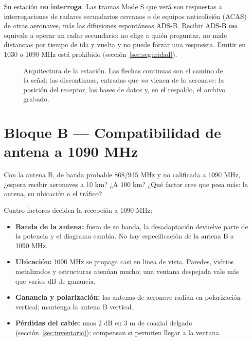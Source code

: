 \begin{alerta}
Su estación \textbf{no interroga}. Las tramas Mode S que verá son respuestas a interrogaciones de radares secundarios cercanos o de equipos anticolisión (ACAS) de otras aeronaves, más las difusiones espontáneas ADS-B. Recibir ADS-B \textbf{no} equivale a operar un radar secundario: no elige a quién preguntar, no mide distancias por tiempo de ida y vuelta y no puede forzar una respuesta. Emitir en 1030 o 1090 MHz está prohibido (sección~\ref{sec:seguridad}).
\end{alerta}

\begin{figure}[H]
\centering
\resizebox{\linewidth}{!}{}
\caption{Arquitectura de la estación. Las flechas continuas son el camino de la señal; las discontinuas, entradas que \emph{no} vienen de la aeronave: la posición del receptor, las bases de datos y, en el respaldo, el archivo grabado.}
\label{fig:cadenaadsb}
\end{figure}

\section{Bloque B --- Compatibilidad de antena a 1090 MHz}
\label{sec:u-antena}

\begin{prediccion}
Con la antena B, de banda probable 868/915 MHz y no calificada a 1090 MHz, ¿espera recibir aeronaves a 10 km? ¿A 100 km? ¿Qué factor cree que pesa más: la antena, su ubicación o el tráfico?
\end{prediccion}

Cuatro factores deciden la recepción a 1090 MHz:
\begin{itemize}
  \item \textbf{Banda de la antena:} fuera de su banda, la desadaptación devuelve parte de la potencia y el diagrama cambia. No hay especificación de la antena B a 1090 MHz.
  \item \textbf{Ubicación:} 1090 MHz se propaga casi en línea de vista. Paredes, vidrios metalizados y estructuras atenúan mucho; una ventana despejada vale más que varios dB de ganancia.
  \item \textbf{Ganancia y polarización:} las antenas de aeronave radian en polarización vertical; mantenga la antena B vertical.
  \item \textbf{Pérdidas del cable:} unos 2 dB en 3 m de coaxial delgado (sección~\ref{sec:inventario}); compensan si permiten llegar a la ventana.
\end{itemize}

